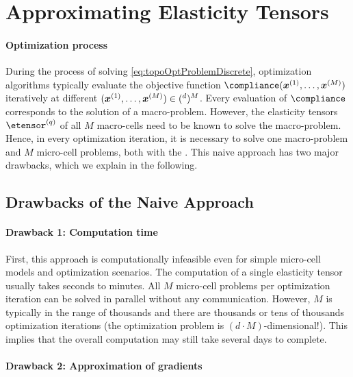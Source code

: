 \breakpagebeforenextheadingtrue
\section{Approximating Elasticity Tensors}
\label{sec:62tensors}

\paragraph{Optimization process}


During the process of solving \eqref{eq:topoOptProblemDiscrete},
optimization algorithms typically
evaluate the objective function $\compliance(\*x^{(1)}, \dotsc, \*x^{(M)})$
iteratively at different 
$(\*x^{(1)}, \dotsc, \*x^{(M)}) \in (\real^d)^M$.
Every evaluation of $\compliance$ corresponds to the solution of a
macro-problem.
However, the elasticity tensors $\etensor^{(q)}$ of all $M$ macro-cells
need to be known to solve the macro-problem.
Hence, in every optimization iteration, it is necessary to solve
one macro-problem and $M$ micro-cell problems,
both with the \fem.
This naive approach has two major drawbacks, which we explain in
the following.



\subsection{Drawbacks of the Naive Approach}
\label{sec:621drawbacks}

\paragraph{Drawback 1: Computation time}

First, this approach is computationally infeasible
even for simple micro-cell models and optimization scenarios.
The computation of a single elasticity tensor usually takes seconds to
minutes.
All $M$ micro-cell problems per optimization iteration
can be solved in parallel without any communication.
However, $M$ is typically in the range of thousands and
there are thousands or tens of thousands optimization iterations
(the optimization problem is $(d \cdot M)$-dimensional!).
This implies that the overall computation may still take
several days to complete.

\paragraph{Drawback 2: Approximation of gradients}

